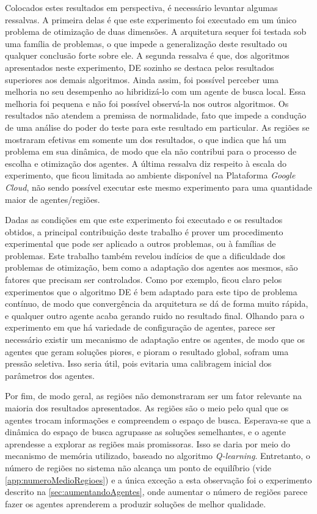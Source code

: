 Colocados estes resultados em perspectiva, é necessário levantar algumas ressalvas. A primeira delas é que este experimento foi executado em um único problema de otimização de duas dimensões. A arquitetura sequer foi testada sob uma família de problemas, o que impede a generalização deste resultado ou qualquer conclusão forte sobre ele. A segunda ressalva é que, dos algoritmos apresentados neste experimento, DE sozinho se destaca pelos resultados superiores aos demais algoritmos. Ainda assim, foi possível perceber uma melhoria no seu desempenho ao hibridizá-lo com um agente de busca local. Essa melhoria foi pequena e não foi possível observá-la nos outros algoritmos. Os resultados não atendem a premissa de normalidade, fato que impede a condução de uma análise do poder do teste para este resultado em particular. As regiões se mostraram efetivas em somente um dos resultados, o que indica que há um problema em sua dinâmica, de modo que ela não contribui para o processo de escolha e otimização dos agentes. A última ressalva diz respeito à escala do experimento, que ficou limitada ao ambiente disponível na Plataforma \textit{Google Cloud}, não sendo possível executar este mesmo experimento para uma quantidade maior de agentes/regiões.

Dadas as condições em que este experimento foi executado e os resultados obtidos, a principal contribuição deste trabalho é prover um procedimento experimental que pode ser aplicado a outros problemas, ou à famílias de problemas. Este trabalho também revelou indícios de que a dificuldade dos problemas de otimização, bem como a adaptação dos agentes aos mesmos, são fatores que precisam ser controlados. Como por exemplo, ficou claro pelos experimentos que o algoritmo DE é bem adaptado para este tipo de problema contínuo, de modo que convergência da arquitetura se dá de forma muito rápida, e qualquer outro agente acaba gerando ruido no resultado final. Olhando para o experimento em que há variedade de configuração de agentes, parece ser necessário existir um mecanismo de adaptação entre os agentes, de modo que os agentes que geram soluções piores, e pioram o resultado global, sofram uma pressão seletiva. Isso seria útil, pois evitaria uma calibragem inicial dos parâmetros dos agentes. 

Por fim, de modo geral, as regiões não demonstraram ser um fator relevante na maioria dos resultados apresentados. As regiões são o meio pelo qual que os agentes trocam informações e compreendem o espaço de busca. Esperava-se que a dinâmica do espaço de busca agrupasse as soluções semelhantes, e o agente aprendesse a explorar as regiões mais promissoras. Isso se daria por meio do mecanismo de memória utilizado, baseado no algoritmo \textit{Q-learning}. Entretanto, o número de regiões no sistema não alcança um ponto de equilíbrio (vide \autoref{app:numeroMedioRegioes}) e a única exceção a esta observação foi o experimento descrito na \autoref{sec:aumentandoAgentes}, onde aumentar o número de regiões parece fazer os agentes aprenderem a produzir soluções de melhor qualidade. 